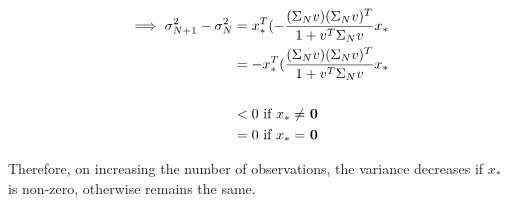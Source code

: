 \documentclass{article}
\begin{document}
\begin{addmargin}{1.5em}
\begin{align*}
        \implies \sigma_{N + 1}^2 - \sigma_{N}^2 &= x_*^T(- \frac{(\Sigma_Nv)(\Sigma_Nv)^T}{1 + v^T\Sigma_Nv}x_* \\
                                                 &= - x_*^T(\frac{(\Sigma_Nv)(\Sigma_Nv)^T}{1 + v^T\Sigma_Nv}x_* \\
                                                 \\
                                                 &< 0 \text{ if $x_* \ne$ \textbf{0}} \\
                                                 &= 0 \text{ if $x_* =$ \textbf{0}}
    \end{align*}
    
    Therefore, on increasing the number of observations, the variance decreases if $x_*$ is non-zero, otherwise remains the same.
    
\end{addmargin}


\clearpage
\end{document}
